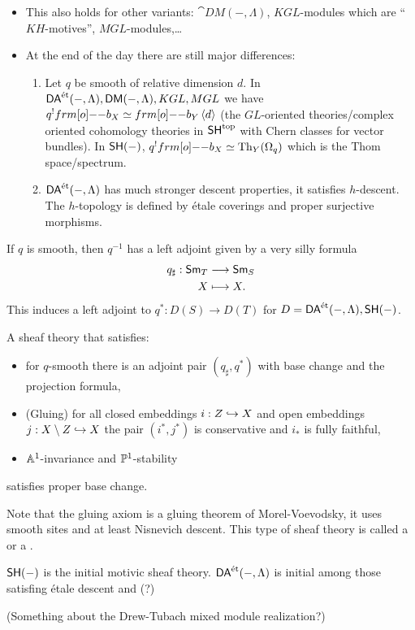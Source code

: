 \begin{remark}\leavevmode
\begin{itemize}
\item This also holds for other variants: $\cat{DM}(-,\Lambda)$, $KGL$-modules which are
``$KH$-motives'',  $MGL$-modules,\dots
\item At the end of the day there are still major differences:
\begin{enumerate}[1)]
\item Let $q$ be smooth of relative dimension $d$. In $\DAet(-,\Lambda),
\cat{DM}(-,\Lambda), KGL, MGL$ we have $q^{!}\1b_X \isoto \1b_Y \left<d \right>$ (the
$GL$-oriented theories/complex oriented cohomology theories in $\SH^{\text{top}}$ with
Chern classes for vector bundles). In $\SH(-)$, $q^{!}\1b_X\isoto
\operatorname{Th}_Y(\Omega_q)$ which is the Thom space/spectrum.
\item $\DAet(-,\Lambda)$ has much stronger descent properties, it satisfies $h$-descent.
The $h$-topology is defined by \'etale coverings and proper surjective morphisms.
\end{enumerate}
\end{itemize}
\end{remark}
If $q$ is smooth, then $q^{-1}$ has a left adjoint given by a very silly formula
\begin{align*}
q_\sharp: \Sm_T &\longrightarrow \Sm_S \\
X &\longmapsto X.
\end{align*}
This induces a left adjoint to $q^{*}:D(S)\to D(T)$ for $D=\DAet(-,\Lambda),\SH(-)$.

\begin{theorem}
A sheaf theory that satisfies:
\begin{itemize}
\item for $q$-smooth there is an adjoint pair $(q_\sharp,q^{*})$ with base change and the
projection formula,
\item (Gluing) for all closed embeddings $i:Z\injto X$ and open embeddings $j:X\setminus
Z\injto X$ the pair $(i^{*},j^{*})$ is conservative and $i_*$ is fully faithful,
\item $\Aff^{1}$-invariance and $\P^{1}$-stability
\end{itemize}
satisfies proper base change.
\end{theorem}
Note that the gluing axiom is a gluing theorem of Morel-Voevodsky, it uses smooth sites
and at least Nisnevich descent. This type of sheaf theory is called a  or a .
\begin{theorem}
$\SH(-)$ is the initial motivic sheaf theory. $\DAet(-,\Lambda)$ is initial among those
satisfing \'etale descent and (?)
\end{theorem}
(Something about the Drew-Tubach mixed module realization?)

